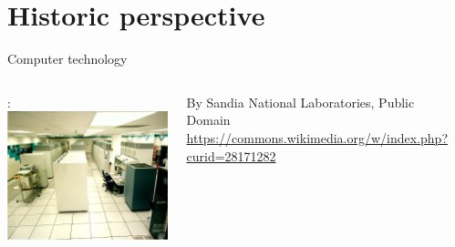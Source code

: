\section{Historic perspective}

\begin{frame}[t]{Computer technology}

\begin{columns}[T]

: \\
\includegraphics[height=.6\textheight]{images/asci-red.jpg}\\
\begin{tiny}
By Sandia National Laboratories, Public Domain\\
\url{https://commons.wikimedia.org/w/index.php?curid=28171282}\\
\end{tiny}

\\

\pause


\end{columns}
\end{frame}
